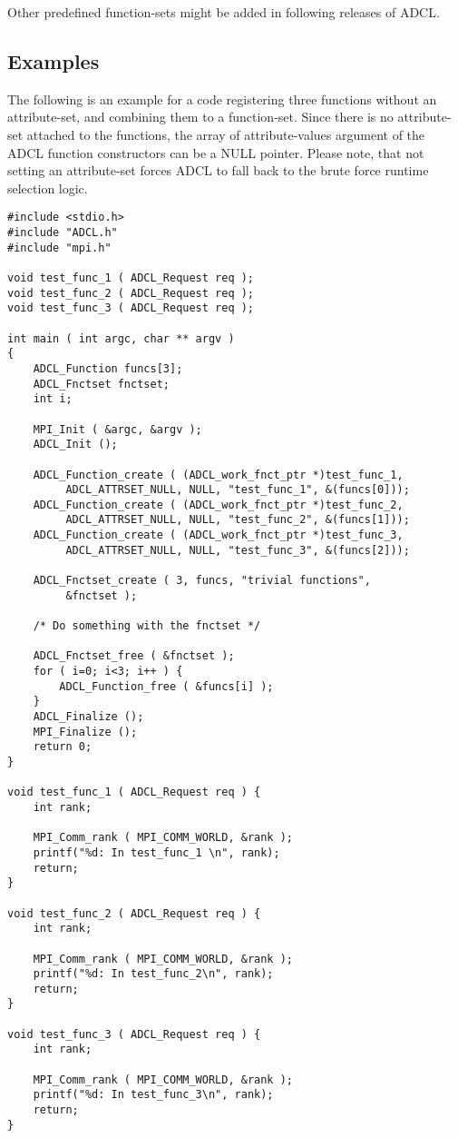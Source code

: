 Other predefined function-sets might be added in following releases of ADCL.

\subsection{Examples}

The following is an example for a code registering three functions without an
attribute-set, and combining them to a function-set. Since there is no
attribute-set attached to the functions, the array of attribute-values
argument of the ADCL function constructors can be a NULL pointer. Please note,
that not setting an attribute-set forces ADCL to fall back to the brute force
runtime selection logic.
\begin{verbatim}
#include <stdio.h>
#include "ADCL.h"
#include "mpi.h"

void test_func_1 ( ADCL_Request req );
void test_func_2 ( ADCL_Request req );
void test_func_3 ( ADCL_Request req );

int main ( int argc, char ** argv ) 
{
    ADCL_Function funcs[3];
    ADCL_Fnctset fnctset;
    int i;
        
    MPI_Init ( &argc, &argv );
    ADCL_Init ();

    ADCL_Function_create ( (ADCL_work_fnct_ptr *)test_func_1, 
         ADCL_ATTRSET_NULL, NULL, "test_func_1", &(funcs[0]));
    ADCL_Function_create ( (ADCL_work_fnct_ptr *)test_func_2, 
         ADCL_ATTRSET_NULL, NULL, "test_func_2", &(funcs[1]));
    ADCL_Function_create ( (ADCL_work_fnct_ptr *)test_func_3, 
         ADCL_ATTRSET_NULL, NULL, "test_func_3", &(funcs[2]));

    ADCL_Fnctset_create ( 3, funcs, "trivial functions", 
         &fnctset );

    /* Do something with the fnctset */
    
    ADCL_Fnctset_free ( &fnctset );
    for ( i=0; i<3; i++ ) {
      	ADCL_Function_free ( &funcs[i] );
    }    
    ADCL_Finalize ();
    MPI_Finalize ();
    return 0;
}

void test_func_1 ( ADCL_Request req ) {
    int rank;
    
    MPI_Comm_rank ( MPI_COMM_WORLD, &rank );
    printf("%d: In test_func_1 \n", rank);
    return;
}

void test_func_2 ( ADCL_Request req ) {
    int rank;
    
    MPI_Comm_rank ( MPI_COMM_WORLD, &rank );
    printf("%d: In test_func_2\n", rank);
    return;
}

void test_func_3 ( ADCL_Request req ) {
    int rank;
    
    MPI_Comm_rank ( MPI_COMM_WORLD, &rank ); 
    printf("%d: In test_func_3\n", rank);
    return;
}

\end{verbatim}
